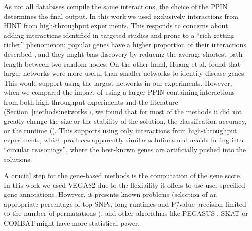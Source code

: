 \documentclass[10pt,letterpaper]{article}
\begin{document}
As not all databases compile the same interactions, the choice of the PPIN determines the final output. In this work we used exclusively interactions from HINT from high-throughput experiments. This responds to concerns about adding interactions identified in targeted studies and prone to a ``rich getting richer'' phenomenon: popular genes have a higher proportion of their interactions described \cite{cai_broker_2010,das_hint:_2012}, and they might bias discovery by reducing the average shortest path length between two random nodes. On the other hand, Huang et al. \cite{huang_systematic_2018} found that larger networks were more useful than smaller networks to identify disease genes. This would support using the largest networks in our experiments. However, when we compared the impact of using a larger PPIN containing interactions from both high-throughput experiments and the literature (Section~\ref{methods:networks}), we found that for most of the methods it did not greatly change the size or the stability of the solution, the classification accuracy, or the runtime (). This supports using only interactions from high-throughput experiments, which produces apparently similar solutions and avoids falling into ``circular reasonings'', where the best-known genes are artificially pushed into the solutions. 

A crucial step for the gene-based methods is the computation of the gene score. In this work we used VEGAS2 \cite{mishra_vegas2:_2015} due to the flexibility it offers to use user-specified gene annotations. However, it presents known problems (selection of an appropriate percentage of top SNPs, long runtimes and P\=/value precision limited to the number of permutations \cite{nakka_gene_2016}), and other algorithms like PEGASUS \cite{nakka_gene_2016}, SKAT \cite{ionita-laza_sequence_2013} or COMBAT \cite{wang_combat:_2017} might have more statistical power.
\end{document}
